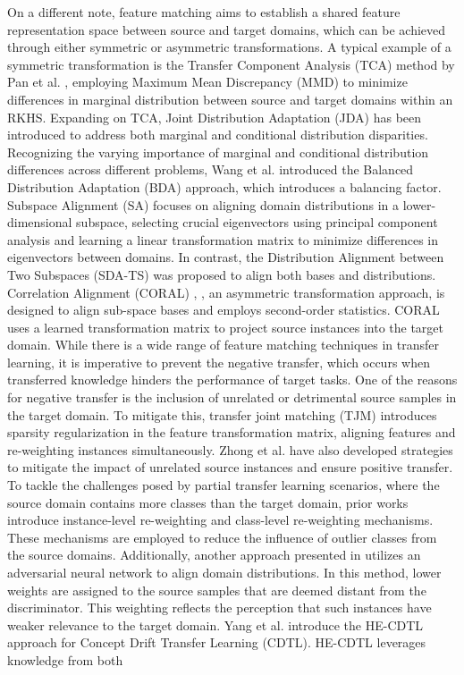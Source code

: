 On a different note, feature matching aims to establish a shared feature representation space between source and target domains, which can be achieved through either symmetric or asymmetric transformations. A typical example of a symmetric transformation is the Transfer Component Analysis (TCA) method by Pan et al. \cite{sun2016return}, employing Maximum Mean Discrepancy (MMD) \cite{zhu2020deep} \cite{long2018transferable}  \cite{long2013transfer} to minimize differences in marginal distribution between source and target domains within an RKHS. Expanding on TCA, Joint Distribution Adaptation (JDA) \cite{wang2020transfer} has been introduced to address both marginal and conditional distribution disparities. Recognizing the varying importance of marginal and conditional distribution differences across different problems, Wang et al. \cite{wang2020transfer} \cite{fernando2013unsupervised} introduced the Balanced Distribution Adaptation (BDA) approach, which introduces a balancing factor. Subspace Alignment (SA) \cite{pearson1901liii} focuses on aligning domain distributions in a lower-dimensional subspace, selecting crucial eigenvectors using principal component analysis \cite{pearson1901liii} and learning a linear transformation matrix to minimize differences in eigenvectors between domains. In contrast, the Distribution Alignment between Two Subspaces (SDA-TS) \cite{pan2010domain} was proposed to align both bases and distributions. Correlation Alignment (CORAL) \cite{rahman2020correlation}, \cite{long2014transfer}, an asymmetric transformation approach, is designed to align sub-space bases and employs second-order statistics. CORAL uses a learned transformation matrix to project source instances into the target domain. While there is a wide range of feature matching techniques in transfer learning, it is imperative to prevent the negative transfer, which occurs when transferred knowledge hinders the performance of target tasks. One of the reasons for negative transfer is the inclusion of unrelated or detrimental source samples in the target domain. To mitigate this, transfer joint matching (TJM) \cite{zhong2009cross} introduces sparsity regularization in the feature transformation matrix, aligning features and re-weighting instances simultaneously. Zhong et al. \cite{cao2018partial} have also developed strategies to mitigate the impact of unrelated source instances and ensure positive transfer. To tackle the challenges posed by partial transfer learning scenarios, where the source domain contains more classes than the target domain, prior works \cite{cao2019learning} \cite{li2020dual} \cite{yang2021concept} introduce instance-level re-weighting and class-level re-weighting mechanisms. These mechanisms are employed to reduce the influence of outlier classes from the source domains. Additionally, another approach presented in \cite{shan2018online} utilizes an adversarial neural network to align domain distributions. In this method, lower weights are assigned to the source samples that are deemed distant from the discriminator. This weighting reflects the perception that such instances have weaker relevance to the target domain. Yang et al. \cite{powers2020evaluation} introduce the HE-CDTL approach for Concept Drift Transfer Learning (CDTL). HE-CDTL leverages knowledge from both 